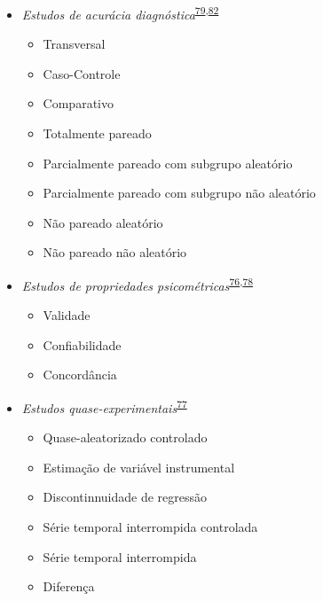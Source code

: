 \documentclass[
]{book}
\providecommand{\tightlist}{%
  \setlength{\itemsep}{0pt}\setlength{\parskip}{0pt}}
\begin{document}
\begin{itemize}
\tightlist
\item
  \emph{Estudos de acurácia diagnóstica}\textsuperscript{\protect\hyperlink{ref-Chassuxe92019}{79},\protect\hyperlink{ref-Yang2021}{82}}

  \begin{itemize}
  \tightlist
  \item
    Transversal
  \item
    Caso-Controle
  \item
    Comparativo
  \item
    Totalmente pareado
  \item
    Parcialmente pareado com subgrupo aleatório
  \item
    Parcialmente pareado com subgrupo não aleatório
  \item
    Não pareado aleatório
  \item
    Não pareado não aleatório
  \end{itemize}
\end{itemize}

\begin{itemize}
\tightlist
\item
  \emph{Estudos de propriedades psicométricas}\textsuperscript{\protect\hyperlink{ref-Souza2017}{76},\protect\hyperlink{ref-echevarruxeda-guanilo2019}{78}}

  \begin{itemize}
  \tightlist
  \item
    Validade
  \item
    Confiabilidade
  \item
    Concordância
  \end{itemize}
\end{itemize}

\begin{itemize}
\tightlist
\item
  \emph{Estudos quase-experimentais}\textsuperscript{\protect\hyperlink{ref-reeves2017}{77}}

  \begin{itemize}
  \tightlist
  \item
    Quase-aleatorizado controlado
  \item
    Estimação de variável instrumental
  \item
    Discontinnuidade de regressão
  \item
    Série temporal interrompida controlada
  \item
    Série temporal interrompida
  \item
    Diferença
  \end{itemize}
\end{itemize}
\end{document}
